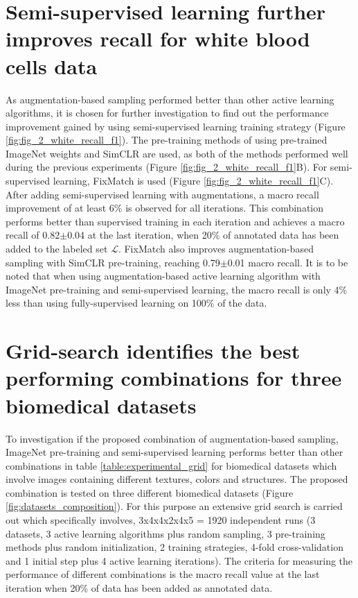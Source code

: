 \section{Semi-supervised learning further improves recall for white blood cells data}
As augmentation-based sampling performed better than other active learning algorithms, it is chosen for further investigation to find out the performance improvement gained by using semi-supervised learning training strategy (Figure \ref{fig:fig_2_white_recall_f1}). The pre-training methods of using pre-trained ImageNet weights and SimCLR are used, as both of the methods performed well during the previous experiments (Figure \ref{fig:fig_2_white_recall_f1}B). For semi-supervised learning, FixMatch is used (Figure \ref{fig:fig_2_white_recall_f1}C). After adding semi-supervised learning with augmentations, a macro recall improvement of at least 6\% is observed for all iterations. This combination performs better than supervised training in each iteration and achieves a macro recall of 0.82$\pm$0.04 at the last iteration, when 20\% of annotated data has been added to the labeled set $\mathcal{L}$. FixMatch also improves augmentation-based sampling with SimCLR pre-training, reaching 0.79$\pm$0.01 macro recall. It is to be noted that when using augmentation-based active learning algorithm with ImageNet pre-training and semi-supervised learning, the macro recall is only 4\% less than using fully-supervised learning on 100\% of the data.

\section{Grid-search identifies the best performing combinations for three biomedical datasets}
To investigation if the proposed combination of augmentation-based sampling, ImageNet pre-training and semi-supervised learning performs better than other combinations in table \ref{table:experimental_grid} for biomedical datasets which involve images containing different textures, colors and structures. The proposed combination is tested on three different biomedical datasets (Figure \ref{fig:datasets_composition}). For this purpose an extensive grid search is carried out which specifically involves, 3x4x4x2x4x5 = 1920 independent runs (3 datasets, 3 active learning algorithms plus random sampling, 3 pre-training methods plus random initialization, 2 training strategies, 4-fold cross-validation and 1 initial step plus 4 active learning iterations). The criteria for measuring the performance of different combinations is the macro recall value at the last iteration when 20\% of data has been added as annotated data.

